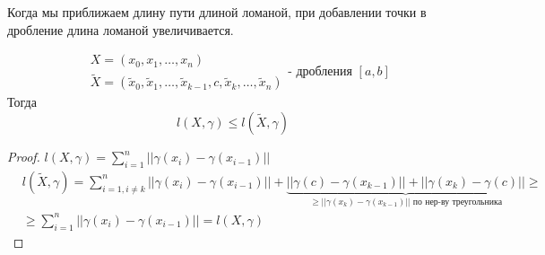 \documentclass[../main.tex]{subfiles}
\begin{document}
\begin{note}
    \hypertarget{note:add_point_in_x}{Когда мы приближаем длину пути длиной ломаной, при добавлении точки в дробление длина ломаной увеличивается. }

    \begin{equation*}
        \begin{aligned}
            &X=\left( x_0, x_1, \dots, x_n\right)\\ 
            &\tilde{ X}=(\tilde{ x}_0, \tilde{ x}_1, \dots, \tilde{ x}_{k-1},c, \tilde{ x}_k, \dots, \tilde{ x}_n)
        \end{aligned}
        \text{- дробления } \left[ a,b\right]
    \end{equation*}
    Тогда 
    \[ l \left( X, \gamma \right) \leq l( \tilde{ X}, \gamma ) \]
\end{note}
\begin{proof}
    \(l\left( X, \gamma \right)= \sum\limits_{ i=1}^{ n} \left| \left| \gamma \left( x_i\right)- \gamma \left( x_{i-1}\right)\right|\right|\)\\
    \begin{equation*}
        \begin{aligned}
            &l( \tilde{ X}, \gamma)= \sum\limits_{i=1, i \neq k}^{n} \left| \left| \gamma \left( x_i\right)- \gamma \left( x_{i-1}\right)\right|\right|+ \underbrace{\left| \left| \gamma \left( c\right)- \gamma \left( x_{k-1}\right)\right|\right|+\left| \left| \gamma \left( x_k\right)- \gamma \left( c\right)\right|\right|}_{ \geq \left| \left| \gamma \left( x_k\right)- \gamma \left( x_{k-1}\right)\right|\right| \text{ по нер-ву треугольника}} \geq\\
            &\geq \sum\limits_{ i=1}^{ n} \left| \left| \gamma \left( x_i\right)- \gamma \left( x_{i-1}\right)\right|\right|=l \left( X, \gamma \right)
        \end{aligned}
    \end{equation*}
\end{proof}
\end{document}
